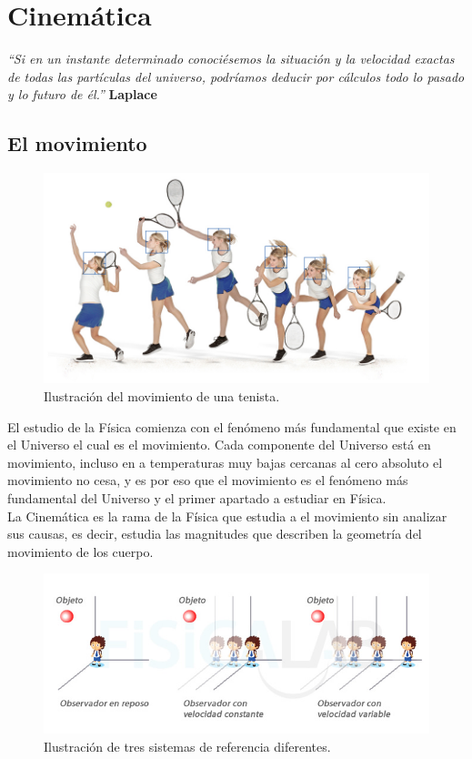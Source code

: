 \chapter{Cinemática}

\textit{``Si en un instante determinado conociésemos la situación y la velocidad exactas de todas las partículas del universo, 
podríamos deducir por cálculos todo lo pasado y lo futuro de él.''}  \textbf{Laplace}

\section{El movimiento}

\begin{figure}[ht]
 \centering
 \includegraphics[scale=0.3]{images/movimiento.jpg}
 \caption{Ilustración del movimiento de una tenista.}
 \label{fig:vectorial}
\end{figure}

El estudio de la Física comienza con el fenómeno más fundamental que existe en el Universo el cual es el movimiento. Cada 
componente del Universo está en movimiento, incluso en a temperaturas muy bajas cercanas al cero absoluto el movimiento no cesa, 
y 
es por eso que el movimiento es el fenómeno más fundamental del Universo y el primer apartado a estudiar en Física.\\

La Cinemática es la rama de la Física que estudia a el movimiento sin analizar sus causas, es decir, estudia las magnitudes que 
describen la geometría del movimiento de los cuerpo.\\ 

\begin{figure}[ht]
 \centering
 \includegraphics[scale=0.37]{images/sistema_inercial_no_inercial.jpg}
 \caption{Ilustración de tres sistemas de referencia diferentes.}
\end{figure}

